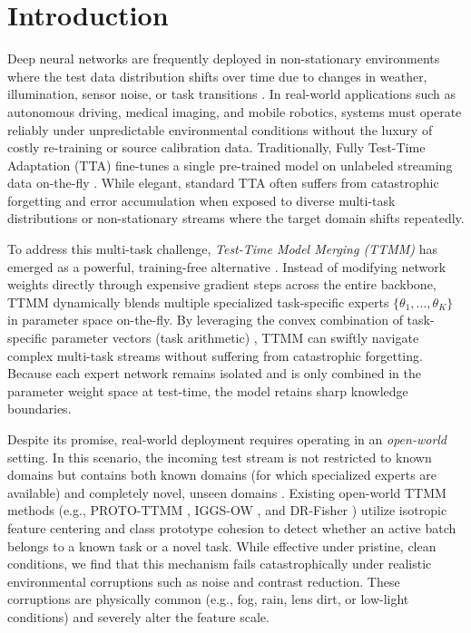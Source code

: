 \documentclass{article}
\theoremstyle{plain}
\theoremstyle{definition}
\theoremstyle{remark}
\begin{document}
\section{Introduction}
\label{sec:intro}
Deep neural networks are frequently deployed in non-stationary environments where the test data distribution shifts over time due to changes in weather, illumination, sensor noise, or task transitions \cite{liang2023comprehensive, niu2023stable, hendrycks2019benchmarking}. In real-world applications such as autonomous driving, medical imaging, and mobile robotics, systems must operate reliably under unpredictable environmental conditions without the luxury of costly re-training or source calibration data. Traditionally, Fully Test-Time Adaptation (TTA) fine-tunes a single pre-trained model on unlabeled streaming data on-the-fly \cite{wang2021tent}. While elegant, standard TTA often suffers from catastrophic forgetting and error accumulation when exposed to diverse multi-task distributions or non-stationary streams where the target domain shifts repeatedly.

To address this multi-task challenge, \emph{Test-Time Model Merging (TTMM)} has emerged as a powerful, training-free alternative \cite{zhao2024dynamic, yang2024adamerging}. Instead of modifying network weights directly through expensive gradient steps across the entire backbone, TTMM dynamically blends multiple specialized task-specific experts $\{\theta_1, \ldots, \theta_K\}$ in parameter space on-the-fly. By leveraging the convex combination of task-specific parameter vectors (task arithmetic) \cite{ilharco2023editing, wortsman202ModelSoups}, TTMM can swiftly navigate complex multi-task streams without suffering from catastrophic forgetting. Because each expert network remains isolated and is only combined in the parameter weight space at test-time, the model retains sharp knowledge boundaries.

Despite its promise, real-world deployment requires operating in an \emph{open-world} setting. In this scenario, the incoming test stream is not restricted to known domains but contains both known domains (for which specialized experts are available) and completely novel, unseen domains \cite{proto_ttmm}. Existing open-world TTMM methods (e.g., PROTO-TTMM \cite{proto_ttmm}, IGGS-OW \cite{iggs_ow}, and DR-Fisher \cite{dr_fisher}) utilize isotropic feature centering and class prototype cohesion to detect whether an active batch belongs to a known task or a novel task. While effective under pristine, clean conditions, we find that this mechanism fails catastrophically under realistic environmental corruptions such as noise and contrast reduction. These corruptions are physically common (e.g., fog, rain, lens dirt, or low-light conditions) and severely alter the feature scale.
\end{document}
